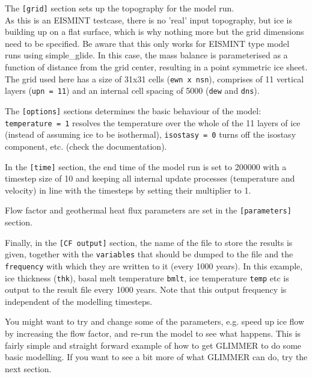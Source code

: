 The \texttt{[grid]} section sets up the topography for the model run.\\
As this is an EISMINT testcase, there is no 'real' input topography, but ice is building up on a
flat surface, which is why nothing more but the grid dimensions need to be specified. Be aware that
this only works for EISMINT type model runs using simple\_glide.
In this case, the mass balance is parameterised as a function of distance
from the grid center, resulting in a point symmetric ice sheet.
The grid used here has a size of 31x31 cells (\texttt{ewn x
nsn}), comprises of 11 vertical layers (\texttt{upn = 11}) and an internal cell spacing of
5000 (\texttt{dew} and \texttt{dns}).

The \texttt{[options]} sections determines the basic behaviour of the model:\\
\texttt{temperature = 1} resolves the temperature over the whole of the 11
layers of ice (instead of assuming ice to be isothermal), \texttt{isostasy = 0}
turns off the isostasy component, etc. (check the documentation).

In the \texttt{[time]} section, the end time of the model run is set to 200000
with a timestep size of 10 and keeping all internal update processes
(temperature and velocity) in line with the timesteps by setting their
multiplier to 1.

Flow factor and geothermal heat flux parameters are set in the
\texttt{[parameters]} section.

Finally, in the \texttt{[CF output]} section, the name of the file to store the results
is given, together with the \texttt{variables} that should be dumped to the file and the
\texttt{frequency} with which they are written to it (every 1000 years). In this example, 
ice thickness (\texttt{thk}), basal melt temperature \texttt{bmlt}, ice temperature \texttt{temp} etc 
is output to the result file every 1000 years. Note that this output frequency is independent of the
modelling timesteps.

You might want to try and change some of the parameters, e.g. speed up ice flow by 
increasing the flow factor, and re-run the model to see what happens.
This is fairly simple and straight forward example of how to get GLIMMER to do some 
basic modelling. If you want to see a bit more of what GLIMMER can do, try the next section.
